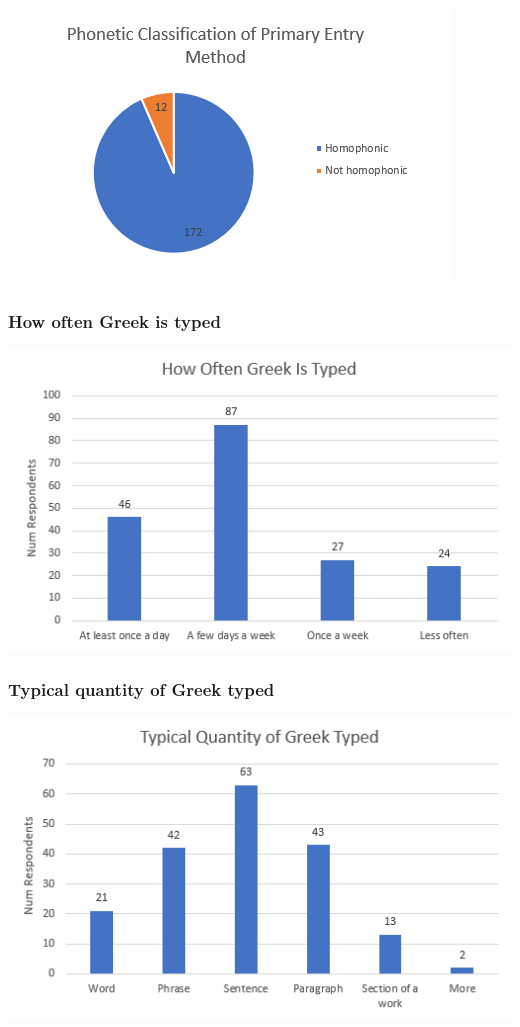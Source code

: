 \documentclass[11pt]{article}
\begin{document}
\begin{center}
\includegraphics[width=.9\linewidth]{./images/homophonic.PNG}
\end{center}

\subsubsection{How often Greek is typed}
\label{sec:org01c195f}

\begin{center}
\includegraphics[width=.9\linewidth]{./images/typing-frequency.PNG}
\end{center}

\subsubsection{Typical quantity of Greek typed}
\label{sec:org69f128c}

\begin{center}
\includegraphics[width=.9\linewidth]{./images/typing-quantity.PNG}
\end{center}
\end{document}
